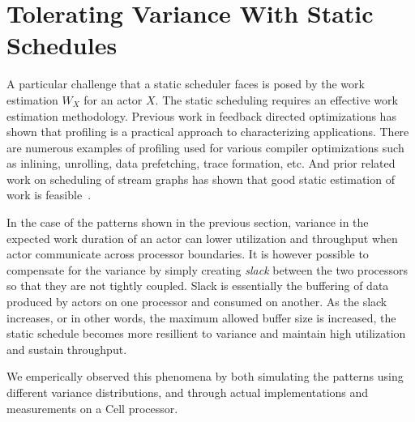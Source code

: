 \section{Tolerating Variance With Static Schedules}

A particular challenge that a static scheduler faces is posed by the
work estimation $W_X$ for an actor $X$. The static scheduling requires
an effective work estimation methodology. Previous work in feedback
directed optimizations has shown that profiling is a practical
approach to characterizing applications. There are numerous examples
of profiling used for various compiler optimizations such as inlining,
unrolling, data prefetching, trace formation, etc. And prior related
work on scheduling of stream graphs has shown that good static
estimation of work is
feasible~\cite{mgordon-asplos04,mgordon-asplos06}.

In the case of the patterns shown in the previous section, variance in
the expected work duration of an actor can lower utilization and
throughput when actor communicate across processor boundaries. It is
however possible to compensate for the variance by simply creating
{\it slack} between the two processors so that they are not tightly
coupled. Slack is essentially the buffering of data produced by actors
on one processor and consumed on another. As the slack increases, or
in other words, the maximum allowed buffer size is increased, the
static schedule becomes more resillient to variance and maintain high
utilization and sustain throughput.

We emperically observed this phenomena by both simulating the patterns
using different variance distributions, and through actual
implementations and measurements on a Cell processor.